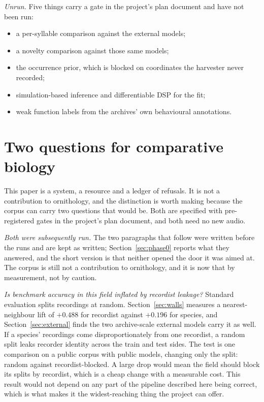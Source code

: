 \documentclass[10pt,twocolumn,a4paper]{article}
\begin{document}
\emph{Unrun.} Five things carry a gate in the project's plan document and have not been run:

\begin{itemize}\itemsep2pt
  \item a per-syllable comparison against the external models;
  \item a novelty comparison against those same models;
  \item the occurrence prior, which is blocked on coordinates the harvester never recorded;
  \item simulation-based inference and differentiable DSP for the fit;
  \item weak function labels from the archives' own behavioural annotations.
\end{itemize}

\section{Two questions for comparative biology}
\label{sec:next}

This paper is a system, a resource and a ledger of refusals. It is not a contribution to
ornithology, and the distinction is worth making because the corpus can carry two questions
that would be. Both are specified with pre-registered gates in the project's plan document,
and both need no new audio.

\emph{Both were subsequently run.} The two paragraphs that follow were written before the
runs and are kept as written; Section~\ref{sec:phase0} reports what they answered, and the
short version is that neither opened the door it was aimed at. The corpus is still not a
contribution to ornithology, and it is now that by measurement, not by caution.

\emph{Is benchmark accuracy in this field inflated by recordist leakage?} Standard evaluation
splits recordings at random. Section~\ref{sec:walls} measures a nearest-neighbour lift of
$+0.488$ for recordist against $+0.196$ for species, and Section~\ref{sec:external} finds the
two archive-scale external models carry it as well. If a species' recordings come
disproportionately from one recordist, a random split leaks recorder identity across the
train and test sides. The test is one comparison on a public corpus with public models,
changing only the split: random against recordist-blocked. A large drop would mean the field
should block its splits by recordist, which is a cheap change with a measurable cost. This
result would not depend on any part of the pipeline described here being correct, which is
what makes it the widest-reaching thing the project can offer.
\end{document}
